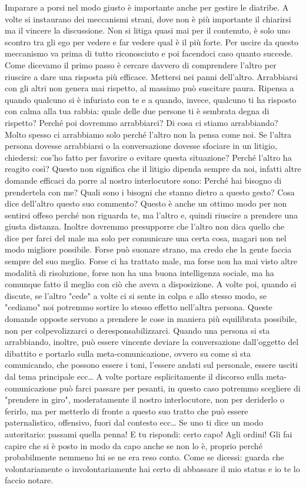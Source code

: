 \documentclass[12pt]{book} %
\begin{document}
\bigskip

Imparare a porsi nel modo giusto è importante anche per gestire le diatribe. A volte si instaurano dei meccanismi
strani, dove non è più importante il chiarirsi ma il vincere la discussione. 
Non si litiga quasi mai per il contenuto, è solo uno scontro tra gli ego per vedere e far vedere qual è il più forte. 
Per uscire da questo meccanismo va prima di tutto riconosciuto e poi facendoci caso quanto
succede. Come dicevamo il primo passo è cercare davvero di comprendere l'altro per riuscire a dare
una risposta più efficace. Mettersi nei panni dell'altro. 
Arrabbiarsi con gli altri non genera mai rispetto, al massimo può suscitare paura. Ripensa a quando qualcuno si è infuriato con te e a quando, invece, qualcuno ti ha risposto con calma alla tua rabbia: quale delle due persone ti è sembrata degna di rispetto? 
Perché poi dovremmo arrabbiarci? Di cosa ci stiamo arrabbiando? Molto spesso ci arrabbiamo solo perché l'altro non la pensa come noi.
Se l'altra persona dovesse arrabbiarsi o la conversazione dovesse sfociare in un litigio, chiedersi: cos'ho fatto per favorire o evitare questa
situazione? Perché l'altro ha reagito così? 
Questo non significa che il litigio dipenda sempre da noi, infatti altre domande efficaci da porre al nostro interlocutore sono:
Perché hai bisogno di prendertela con me? Quali sono i bisogni che stanno dietro a questo gesto?
Cosa dice dell'altro questo suo commento?
Questo è anche un ottimo modo per non sentirsi offeso perché non riguarda te, ma l'altro e, quindi riuscire a prendere una giusta distanza.
Inoltre dovremmo presupporre che l'altro non dica quello che dice per farci del male ma solo per comunicare una certa cosa, magari non nel modo migliore possibile. 
Forse può suonare strano, ma credo che la gente faccia sempre del suo meglio. Forse ci ha trattato male, ma forse non ha mai visto altre modalità di risoluzione, forse non ha una buona intelligenza sociale, ma ha comunque fatto il meglio con ciò che aveva a disposizione.
A volte poi, quando si discute, se l'altro "cede" a volte ci si sente in colpa e allo stesso modo, se "cediamo" noi potremmo sortire lo stesso effetto nell'altra persona.
Queste domande opposte servono a prendere le cose in maniera più equilibrata possibile, non per colpevolizzarci o deresponsabilizzarci.
Quando una persona si sta arrabbiando, inoltre, può essere vincente deviare la conversazione dall'oggetto del dibattito e portarlo sulla meta-comunicazione, ovvero su come si sta comunicando, che possono essere i toni, l'essere andati sul personale, essere usciti dal tema principale ecc… 
A volte portare esplicitamente il discorso sulla meta-comunicazione può farci passare per pesanti, in questo caso potremmo scegliere di "prendere in giro", moderatamente il nostro interlocutore, non per deriderlo o ferirlo, ma per metterlo di fronte a questo suo tratto che può essere paternalistico, offensivo, fuori dal contesto ecc… Se uno ti dice un modo autoritario: passami quella penna! E tu rispondi: certo capo! Agli ordini! Gli fai capire che si è posto in modo da capo anche se non lo è, proprio perché probabilmente nemmeno lui se ne era reso conto. Come se dicessi: guarda che volontariamente o involontariamente hai certo di abbassare il mio status e io te lo faccio notare.
\end{document}
